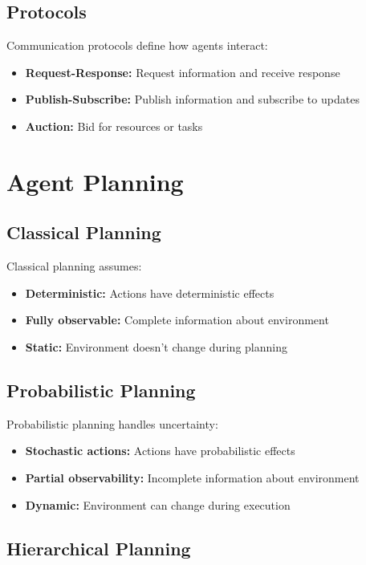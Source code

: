 \subsection{Protocols}

Communication protocols define how agents interact:
\begin{itemize}
    \item \textbf{Request-Response:} Request information and receive response
    \item \textbf{Publish-Subscribe:} Publish information and subscribe to updates
    \item \textbf{Auction:} Bid for resources or tasks
\end{itemize}

\section{Agent Planning}

\subsection{Classical Planning}

Classical planning assumes:
\begin{itemize}
    \item \textbf{Deterministic:} Actions have deterministic effects
    \item \textbf{Fully observable:} Complete information about environment
    \item \textbf{Static:} Environment doesn't change during planning
\end{itemize}

\subsection{Probabilistic Planning}

Probabilistic planning handles uncertainty:
\begin{itemize}
    \item \textbf{Stochastic actions:} Actions have probabilistic effects
    \item \textbf{Partial observability:} Incomplete information about environment
    \item \textbf{Dynamic:} Environment can change during execution
\end{itemize}

\subsection{Hierarchical Planning}

